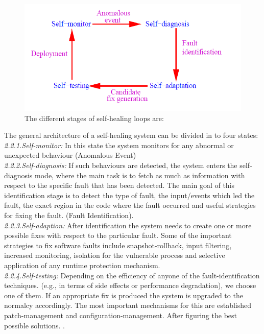 \begin{figure}[H]
\includegraphics[width=5in]{img/SelfHealingStagesKeromytis}
\caption{The different stages of self-healing loops are:}
\end{figure}

The general architecture of a self-healing system can be divided in to four states: \\

\textit{2.2.1.Self-monitor:} In this state the system monitors for any abnormal or unexpected behaviour (Anomalous Event)\\

\textit{2.2.2.Self-diagnosis:} If such behaviours are detected, the system enters the self-diagnosis mode, where the main task is to fetch as much as information with respect to the specific fault that has been detected. The main goal of this identification stage is to detect the type of fault, the input/events which led the fault, the exact region in the code where the fault occurred and useful strategies for fixing the fault. (Fault Identification).\\

\textit{2.2.3.Self-adaption:} After identification the system needs to create one or more possible fixes with respect to the particular fault. Some of the important strategies to fix software faults include snapshot-rollback, input filtering, increased monitoring, isolation for the vulnerable process and selective application of any runtime protection mechanism.\\

\textit{2.2.4.Self-testing:} Depending on the efficiency of anyone of the fault-identification techniques. (e.g., in terms of side effects or performance degradation), we choose one of them. If an appropriate fix is produced the system is upgraded to the normalcy accordingly. The most important mechanisms for this are established patch-management and configuration-management. After figuring the best possible solutions.
\cite{Keromytis:SelfHealingSurvey:2011}.\\

